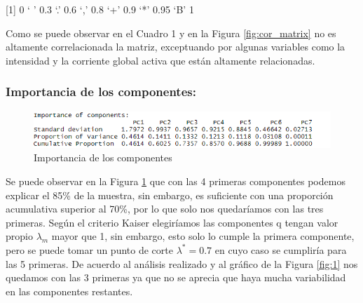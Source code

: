 \documentclass[a4paper,10pt,twocolumn]{report}
\begin{document}
	\begin{table}[H]
		[1] 0 ‘ ’ 0.3 ‘.’ 0.6 ‘,’ 0.8 ‘+’ 0.9 ‘*’ 0.95 ‘B’ 1
		\label{tab:syn_matrix}
		\caption{Matriz de correlación usando \texttt{symnum}}
	\end{table}
	
	Como se puede observar en el Cuadro 1 y en la Figura \ref{fig:cor_matrix} no es altamente correlacionada la matriz, exceptuando por algunas variables como la intensidad y la corriente global activa que están altamente relacionadas.
	
	\subsubsection{Importancia de los componentes:}
	
	
	\begin{figure}[h]
	\centering
	\includegraphics[width=\linewidth]{img/acp/importance}
	\caption{Importancia de los componentes}
	\label{fig:importance}
	\end{figure}
	
	Se puede observar en la Figura \ref{fig:importance} que con las 4 primeras componentes podemos explicar el 85\% de la muestra, sin embargo, es suficiente con una proporción acumulativa  superior al 70\%, por lo que solo nos quedaríamos con las tres primeras. Según el criterio Kaiser elegiríamos las componentes q tengan valor propio $\lambda_m$ mayor que 1, sin embargo, esto solo lo cumple la primera componente, pero se puede tomar un punto de corte $\lambda^* = 0.7$ en cuyo caso se cumpliría para las 5 primeras. De acuerdo al análisis realizado y al gráfico de la Figura \ref{fig:1} nos quedamos con las 3 primeras ya que no se aprecia que haya mucha variabilidad en las componentes restantes.
	
\end{document}
